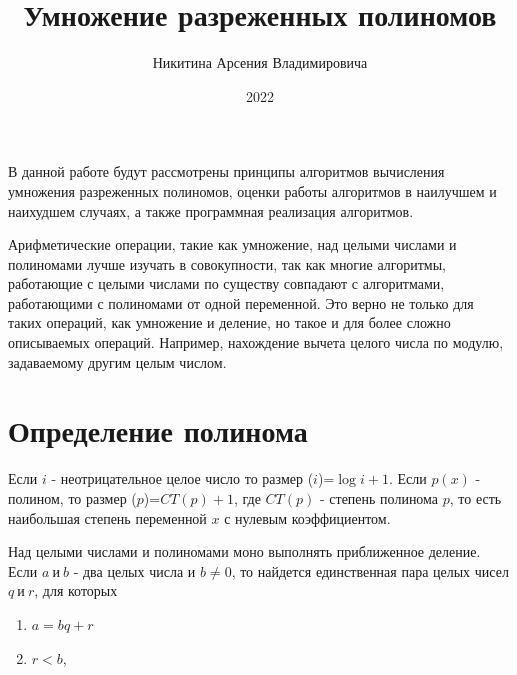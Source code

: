 \documentclass[bachelor, och, labwork]{shiza}
\begin{document}

\title{Умножение разреженных полиномов}





\author{Никитина Арсения Владимировича}



\date{2022}

\maketitle

\tableofcontents

\intro
В данной работе будут рассмотрены принципы алгоритмов вычисления умножения 
разреженных полиномов, оценки работы алгоритмов в наилучшем и наихудшем случаях,
а также программная реализация алгоритмов. 

Арифметические операции, такие как умножение, над целыми числами и полиномами
лучше изучать в совокупности, так как многие алгоритмы, работающие с целыми 
числами по существу совпадают с алгоритмами, работающими с полиномами от одной
переменной. Это верно не только для таких операций, как умножение и деление, но
такое и для более сложно описываемых операций. Например, нахождение вычета
целого числа по модулю, задаваемому другим целым числом.


\section{Определение полинома}

Если $i$ - неотрицательное целое число то размер ($i$)=$\log i+1$. Если $p(x)$
- полином, то размер ($p$)=$CT(p) + 1$, где $CT(p)$ - степень полинома $p$, то
есть наибольшая степень переменной $x$ с нулевым коэффициентом.

Над целыми числами и полиномами моно выполнять приближенное деление. Если 
$a ~\text{и}~ b$ - два целых числа и $b \not= 0$, то найдется единственная пара
целых чисел $q ~\text{и}~ r$, для которых
\begin{enumerate}
    \item $a=bq + r$
    \item $r<b$,
\end{enumerate}
\end{document}
